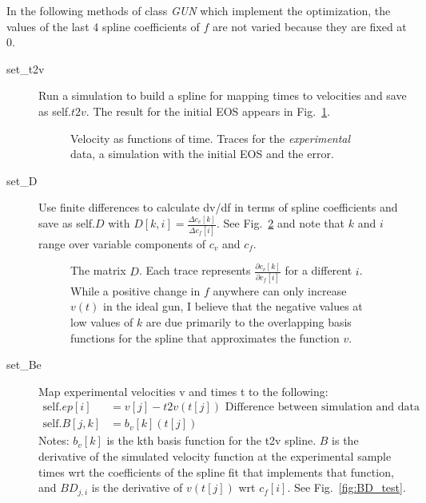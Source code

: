 \documentclass[11pt]{article}
\newcommand\cf{c_f}
\newcommand\cv{c_v}
\newcommand\vbasis{b_v}
\begin{document}
In the following methods of class \emph{GUN} which implement the
optimization, the values of the last 4 spline coefficients of $f$ are
not varied because they are fixed at 0.
\begin{description}
\item[set\_t2v] Run a simulation to build a spline for mapping times to
  velocities and save as self.$t2v$.  The result for the initial EOS
  appears in Fig.~\ref{fig:vt_test}.
  \begin{figure}
    \centering
    \caption{Velocity as functions of time.  Traces for the
      \emph{experimental} data, a simulation with the initial EOS and
      the error.}
    \label{fig:vt_test}
  \end{figure}
\item[set\_D] Use finite differences to calculate dv/df in terms of
  spline coefficients and save as self.$D$ with
  $D[k,i] = \frac{\Delta c_v[k]}{\Delta c_f[i]}$.  See
  Fig.~\ref{fig:D_test} and note that $k$ and $i$ range over variable
  components of $\cv$ and $\cf$.
  \begin{figure}
    \centering
    \caption{The matrix $D$.  Each trace represents
      $\frac{\partial \cv[k]}{\partial \cf[i]}$ for a different $i$.
      While a positive change in $f$ anywhere can only increase $v(t)$
      in the ideal gun, I believe that the negative values at low
      values of $k$ are due primarily to the overlapping basis
      functions for the spline that approximates the function $v$.}
    \label{fig:D_test}
  \end{figure}
\item[set\_Be] Map experimental velocities v and times t to the
  following:
  \begin{align*}        
    \text{self.}ep[i] &= v[j] - t2v(t[j])
                        \text{ Difference between simulation and data} \\
    \text{self.}B[j,k] &= \vbasis[k](t[j])     
  \end{align*}
  Notes: $\vbasis[k]$ is the kth basis function for the t2v spline.
  $B$ is the derivative of the simulated velocity function at the
  experimental sample times wrt the coefficients of the spline fit
  that implements that function, and $BD_{j,i}$ is the derivative of
  $v(t[j])$ wrt $\cf[i]$.  See Fig.~\ref{fig:BD_test}.
  \begin{figure}
    \centering

\end{figure}
\end{description}
\end{document}
